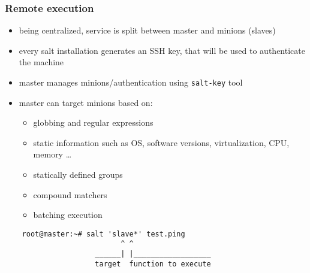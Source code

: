 \documentclass[compress]{beamer}
\begin{document}
\begin{frame}
\frametitle{Remote execution}

\begin{itemize}[<+->]
  \item being centralized, service is split between master and minions (slaves)
  \item every salt installation generates an SSH key, that will be used to authenticate the machine
  \item master manages minions/authentication using \texttt{salt-key} tool
  \item master can target minions based on: 
    \begin{itemize}
        \item globbing and regular expressions
        \item static information such as OS, software versions, virtualization, CPU, memory \ldots
        \item statically defined groups
        \item compound matchers
        \item batching execution
    \end{itemize}
\end{itemize}
\end{frame}

\begin{frame}[fragile]
  \begin{center}
    \begin{verbatim}
    root@master:~# salt 'slave*' test.ping
                           ^ ^
                     ______| |__________________
                     target  function to execute
    \end{verbatim}
  \end{center}
\end{frame}
\end{document}
